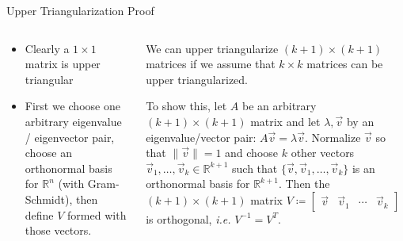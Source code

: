 \begin{frame}{Upper Triangularization Proof}

\begin{columns}[T] %
\begin{column}{.38\textwidth}
%
    \begin{itemize}
        \item Clearly a \(1 \times 1\) matrix is upper triangular
        \item 
            First we choose one arbitrary eigenvalue / eigenvector pair, choose an orthonormal basis for \(\mathbb R^n\) (with Gram-Schmidt), then define \(V\) formed with those vectors.
    \end{itemize}

\end{column}%
\hfill%
\begin{column}{.66\textwidth}
    We can upper triangularize \((k+1) \times (k+1)\) matrices if we assume that \(k \times k\) matrices can be upper triangularized.

    To show this, let \(A\) be an arbitrary \((k+1) \times (k + 1)\) matrix and let \(\lambda, \vec v\) by an eigenvalue/vector pair: \(A \vec v = \lambda \vec v\).
    Normalize \(\vec v\) so that \(\lVert \vec v \rVert = 1\) and choose \(k\) other vectors \(\vec v_1, \ldots, \vec v_k \in \mathbb R^{k+1}\) such that \(\{\vec v, \vec v_1, \ldots, \vec v_k\}\) is an orthonormal basis for \(\mathbb R^{k+1}\). Then the \((k+1) \times (k+1)\) matrix \(V \coloneqq \begin{bmatrix} \vec v & \vec v_1 & \cdots  &\vec v_k \end{bmatrix}\) is orthogonal, \emph{i.e.} 
        \( V^{-1} = V^T
        \).



\end{column}%
\end{columns}


\end{frame}
